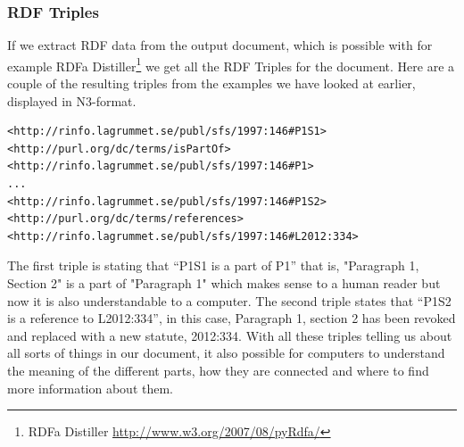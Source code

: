 \subsubsection{RDF Triples}
If we extract RDF data from the output document, which is possible with for example RDFa Distiller\footnote{RDFa Distiller \url{http://www.w3.org/2007/08/pyRdfa/}} we get all the RDF Triples for the document. Here are a couple of the resulting triples from the examples we have looked at earlier, displayed in N3-format.\cite{n3Bib}\\
\begin{verbatim}
<http://rinfo.lagrummet.se/publ/sfs/1997:146#P1S1> 
<http://purl.org/dc/terms/isPartOf>
<http://rinfo.lagrummet.se/publ/sfs/1997:146#P1>
...
<http://rinfo.lagrummet.se/publ/sfs/1997:146#P1S2>
<http://purl.org/dc/terms/references>
<http://rinfo.lagrummet.se/publ/sfs/1997:146#L2012:334>
\end{verbatim}
\linebreak
\newline
The first triple is stating that “P1S1 is a part of P1” that is, "Paragraph 1, Section 2" is a part of "Paragraph 1" which makes sense to a human reader but now it is also understandable to a computer. The second triple states that “P1S2 is a reference to L2012:334”, in this case, Paragraph 1, section 2 has been revoked and replaced with a new statute, 2012:334. With all these triples telling us about all sorts of things in our document, it also possible for computers to understand the meaning of the different parts, how they are connected and where to find more information about them.
\pagebreak
